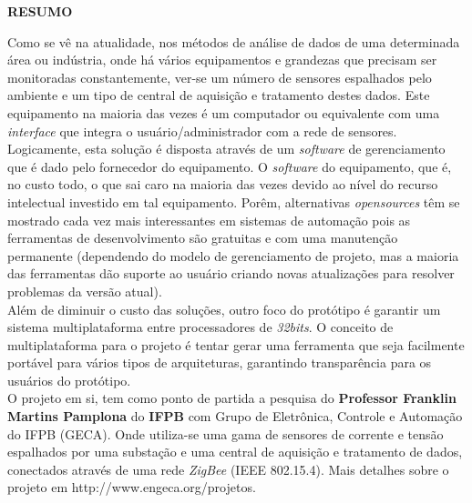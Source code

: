 \documentclass[a4paper, 12pt]{article}
\begin{document}
\begin{center}
\textbf{\large RESUMO}
\end{center}

\vspace{0.5cm}
\indent Como se vê na atualidade, nos métodos de análise de dados de uma determinada área ou indústria, onde há vários equipamentos e grandezas que precisam 
ser monitoradas constantemente, ver-se um número de sensores espalhados pelo ambiente e um tipo de central de aquisição e tratamento destes dados. Este equipamento 
na maioria das vezes é um computador ou equivalente com uma \textit{interface} que integra o usuário/administrador com a rede de sensores. Logicamente, esta solução
é disposta através de um \textit{software} de gerenciamento que é dado pelo fornecedor do equipamento. O \textit{software} do equipamento, que é, no custo todo, 
o que sai caro na maioria das vezes devido ao nível do recurso intelectual investido em tal equipamento. Porêm, alternativas \textit{opensources} têm se mostrado
cada vez mais interessantes em sistemas de automação pois as ferramentas de desenvolvimento são gratuitas e com uma manutenção permanente (dependendo do modelo 
de gerenciamento de projeto, mas a maioria das ferramentas dão suporte ao usuário criando novas atualizações para resolver problemas da versão atual).
\\
\indent Além de diminuir o custo das soluções, outro foco do protótipo é garantir um sistema multiplataforma entre processadores de \textit{32bits}. O conceito 
de multiplataforma para o projeto é tentar gerar uma ferramenta que seja facilmente portável para vários tipos de arquiteturas, garantindo transparência para 
os usuários do protótipo.
\\
\indent O projeto em si, tem como ponto de partida a pesquisa do \textbf{Professor Franklin Martins Pamplona} do \textbf{IFPB} com Grupo de Eletrônica, 
Controle e Automação do IFPB (GECA). Onde utiliza-se uma gama de sensores de corrente e tensão espalhados por uma substação e uma central de aquisição e 
tratamento de dados, conectados através de uma rede \textit{ZigBee} (IEEE 802.15.4). Mais detalhes sobre o projeto em http://www.engeca.org/projetos.
\end{document}
